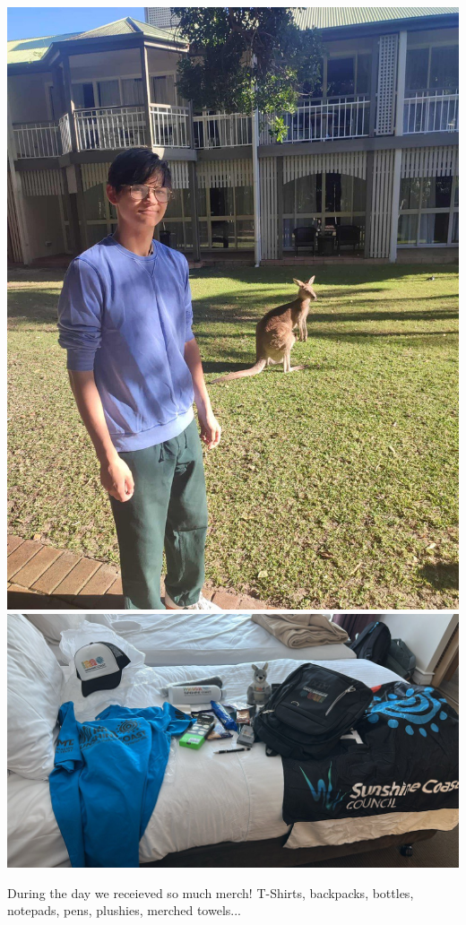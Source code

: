 \documentclass{article}
\begin{document}
\begin{center}
  \includegraphics[scale=0.15]{assets/kangoroo.jpg}
  \includegraphics[scale=0.15]{assets/merch.jpg}
\end{center}

During the day we receieved so much merch! T-Shirts, backpacks, bottles, notepads, pens, plushies, merched towels...
\end{document}

